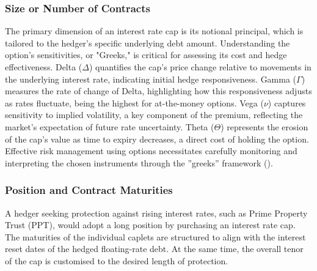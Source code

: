 \documentclass[11pt, a4paper, british]{article}
\begin{document}




\subsubsection{Size or Number of Contracts}
The primary dimension of an interest rate cap is its notional principal, which is tailored to the hedger's specific underlying debt amount. Understanding the option's sensitivities, or "Greeks," is critical for assessing its cost and hedge effectiveness. Delta ($\Delta$) quantifies the cap's price change relative to movements in the underlying interest rate, indicating initial hedge responsiveness. Gamma ($\Gamma$) measures the rate of change of Delta, highlighting how this responsiveness adjusts as rates fluctuate, being the highest for at-the-money options. Vega ($\nu$) captures sensitivity to implied volatility, a key component of the premium, reflecting the market's expectation of future rate uncertainty. Theta ($\Theta$) represents the erosion of the cap's value as time to expiry decreases, a direct cost of holding the option. Effective risk management using options necessitates carefully monitoring and interpreting the chosen instruments through the ''greeks'' framework (\cite{ws}).

\subsubsection{Position and Contract Maturities}
A hedger seeking protection against rising interest rates, such as Prime Property Trust (PPT), would adopt a long position by purchasing an interest rate cap. The maturities of the individual caplets are structured to align with the interest reset dates of the hedged floating-rate debt. At the same time, the overall tenor of the cap is customised to the desired length of protection.
\end{document}
